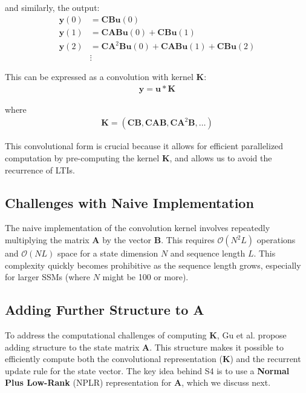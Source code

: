 \documentclass[12pt,a4paper]{report}
\begin{document}
and similarly, the output:
\[
\begin{aligned}
\mathbf{y}(0) &= \mathbf{C}\mathbf{B}\mathbf{u}(0) \\
\mathbf{y}(1) &= \mathbf{C}\mathbf{A}\mathbf{B}\mathbf{u}(0) + \mathbf{C}\mathbf{B}\mathbf{u}(1) \\
\mathbf{y}(2) &= \mathbf{C}\mathbf{A}^2\mathbf{B}\mathbf{u}(0) + \mathbf{C}\mathbf{A}\mathbf{B}\mathbf{u}(1) + \mathbf{C}\mathbf{B}\mathbf{u}(2) \\
&\vdots
\end{aligned}
\]

This can be expressed as a convolution with kernel $\mathbf{K}$:
\[
\begin{aligned}
\mathbf{y} = \mathbf{u} * \mathbf{K}
\end{aligned}
\]

where
\[
\begin{aligned}
\mathbf{K} = (\mathbf{C}\mathbf{B}, \mathbf{C}\mathbf{A}\mathbf{B}, \mathbf{C}\mathbf{A}^2\mathbf{B}, \dots)
\end{aligned}
\]

This convolutional form is crucial because it allows for efficient parallelized computation by pre-computing the kernel $\mathbf{K}$, and allows us to avoid the recurrence of LTIs.

\subsection{Challenges with Naive Implementation}
The naive implementation of the convolution kernel involves repeatedly multiplying the matrix $\mathbf{A}$ by the vector $\mathbf{B}$. This requires $\mathcal{O}(N^2L)$ operations and $\mathcal{O}(NL)$ space for a state dimension $N$ and sequence length $L$. This complexity quickly becomes prohibitive as the sequence length grows, especially for larger SSMs (where $N$ might be 100 or more).

\subsection{Adding Further Structure to A}
To address the computational challenges of computing $\mathbf{K}$, Gu et al. \cite{s4} propose adding structure to the state matrix $\mathbf{A}$. This structure makes it possible to efficiently compute both the convolutional representation ($\mathbf{K}$) and the recurrent update rule for the state vector. The key idea behind S4 is to use a \textbf{Normal Plus Low-Rank} (NPLR) representation for $\mathbf{A}$, which we discuss next.
\end{document}
